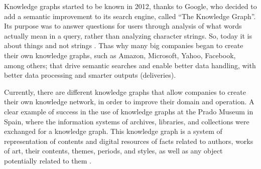 Knowledge graphs started to be known in 2012, thanks to 
Google, who decided to add a semantic improvement to its search 
engine, called “The Knowledge Graph”. Its purpose was to answer 
questions for users through analysis of what words actually mean in a query, 
rather than analyzing character strings. So, today it is about things and not 
strings \cite{Barnard}. Thas why many big companies began to create their own 
knowledge graphs, such as Amazon, Microsoft, Yahoo, Facebook, among others; 
that drive semantic searches and enable better data handling, with better 
data processing and smarter outputs (deliveries).

Currently, there are different knowledge graphs that allow companies to 
create their own knowledge network, in order to improve their domain and 
operation. A clear example of success in the use of knowledge graphs at the 
Prado Museum in Spain, where the information systems of archives, libraries, 
and collections were exchanged for a knowledge graph. This knowledge graph is 
a system of representation of contents and digital resources of facts related 
to authors, works of art, their contents, themes, periods, and styles, as 
well as any object potentially related to them \cite{Museo del Prado}.

